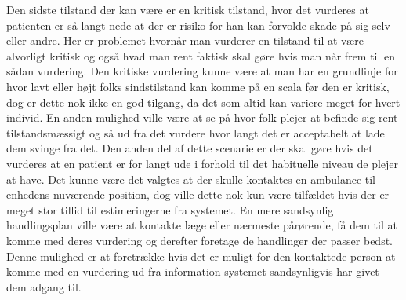 Den sidste tilstand der kan være er en kritisk tilstand, hvor det vurderes at patienten er så langt nede at der er risiko for han kan forvolde skade på sig selv eller andre.
Her er problemet hvornår man vurderer en tilstand til at være alvorligt kritisk og også hvad man rent faktisk skal gøre hvis man når frem til en sådan vurdering.
Den kritiske vurdering kunne være at man har en grundlinje for hvor lavt eller højt folks sindstilstand kan komme på en scala før den er kritisk, dog er dette nok ikke en god tilgang, da det som altid kan variere meget for hvert individ.
En anden mulighed ville være at se på hvor folk plejer at befinde sig rent tilstandsmæssigt og så ud fra det vurdere hvor langt det er acceptabelt at lade dem svinge fra det.
Den anden del af dette scenarie er der skal gøre hvis det vurderes at en patient er for langt ude i forhold til det habituelle niveau de plejer at have.
Det kunne være det valgtes at der skulle kontaktes en ambulance til enhedens nuværende position, dog ville dette nok kun være tilfældet hvis der er meget stor tillid til estimeringerne fra systemet.
En mere sandsynlig handlingsplan ville være at kontakte læge eller nærmeste pårørende, få dem til at komme med deres vurdering og derefter foretage de handlinger der passer bedst.
Denne mulighed er at foretrække hvis det er muligt for den kontaktede person at komme med en vurdering ud fra information systemet sandsynligvis har givet dem adgang til.

